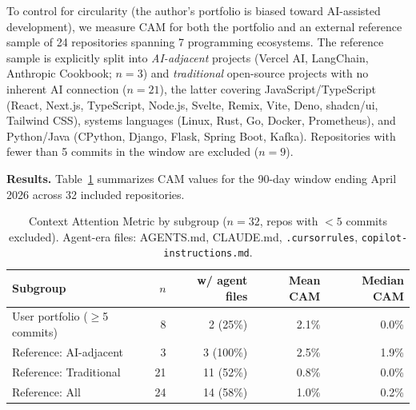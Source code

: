 \documentclass[12pt]{article}
\begin{document}
To control for circularity (the author's portfolio is biased toward AI-assisted development), we measure CAM for both the portfolio and an external reference sample of 24 repositories spanning 7 programming ecosystems. The reference sample is explicitly split into \textit{AI-adjacent} projects (Vercel AI, LangChain, Anthropic Cookbook; $n=3$) and \textit{traditional} open-source projects with no inherent AI connection ($n=21$), the latter covering JavaScript/TypeScript (React, Next.js, TypeScript, Node.js, Svelte, Remix, Vite, Deno, shadcn/ui, Tailwind CSS), systems languages (Linux, Rust, Go, Docker, Prometheus), and Python/Java (CPython, Django, Flask, Spring Boot, Kafka). Repositories with fewer than 5 commits in the window are excluded ($n=9$).

\textbf{Results.} Table~\ref{tab:cam} summarizes CAM values for the 90-day window ending April 2026 across 32 included repositories.

\begin{table}[ht]
\centering
\small
\begin{tabularx}{\textwidth}{lrrrr}
\toprule
\textbf{Subgroup} & \textbf{$n$} & \textbf{w/ agent files} & \textbf{Mean CAM} & \textbf{Median CAM} \\
\midrule
User portfolio ($\geq$5 commits) & 8 & 2 (25\%) & 2.1\% & 0.0\% \\
Reference: AI-adjacent & 3 & 3 (100\%) & 2.5\% & 1.9\% \\
Reference: Traditional & 21 & 11 (52\%) & 0.8\% & 0.0\% \\
\midrule
Reference: All & 24 & 14 (58\%) & 1.0\% & 0.2\% \\
\bottomrule
\end{tabularx}
\caption{Context Attention Metric by subgroup ($n=32$, repos with $<5$ commits excluded). Agent-era files: AGENTS.md, CLAUDE.md, \texttt{.cursorrules}, \texttt{copilot-instructions.md}.}
\label{tab:cam}
\end{table}
\end{document}
